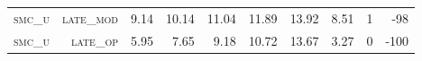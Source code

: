 \begin{landscape}
\begin{table}[!htbp]
\begin{tabular}{@{}rrrrrrr|rrr@{}}
\footnotesize \textsc{smc\_u}      & \footnotesize \textsc{late\_mod }        & \footnotesize  9.14        & \footnotesize 10.14   & \footnotesize 11.04     & \footnotesize 11.89            & \footnotesize 13.92     & \footnotesize 8.51     & \footnotesize 1     & \footnotesize -98      \\
\footnotesize \textsc{smc\_u}      & \footnotesize \textsc{late\_op  }        & \footnotesize  5.95        & \footnotesize 7.65    & \footnotesize 9.18      & \footnotesize 10.72            & \footnotesize 13.67     & \footnotesize 3.27     & \footnotesize 0     & \footnotesize -100      \\
\end{tabular}
\end{table}
\end{landscape}

